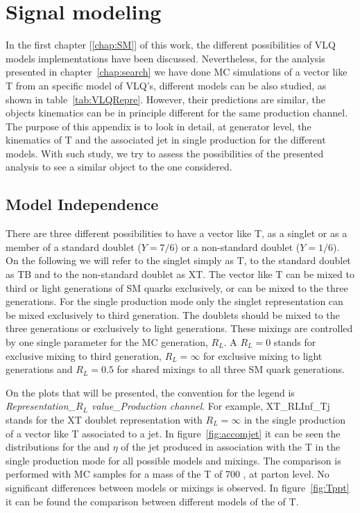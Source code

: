 
\chapter{Signal modeling}
\label{chap:sigmod}

In the first chapter [\ref{chap:SM}] of this work, the different possibilities of VLQ models implementations have been discussed. Nevertheless, for the analysis presented in chapter~\ref{chap:search} we have done MC simulations of a vector like T from an specific model of VLQ's, different models can be also studied, as shown in table~\ref{tab:VLQRepre}. However, their predictions are similar, the objects kinematics can be in principle different for the same production channel. The purpose of this appendix is to look in detail, at generator level, the kinematics of T and the associated jet in single production for the different models. With such study, we try to assess the possibilities of the presented analysis to see a similar object to the one considered.

\section{Model Independence}
\label{sec:modindp}

There are three different possibilities to have a vector like T, as a singlet or as a member of a standard doublet ($Y=7/6$) or a non-standard doublet ($Y=1/6$). On the following we will refer to the singlet simply as T, to the standard doublet as TB and to the non-standard doublet as XT. The vector like T can be mixed to third or light generations of SM quarks exclusively, or can be mixed to the three generations. For the single production mode only the singlet representation can be mixed exclusively to third generation. The doublets should be mixed to the three generations or exclusively to light generations. These mixings are controlled by one single parameter for the MC generation, $R_{L}$. A $R_{L}=0$ stands for exclusive mixing to third generation, $R_{L}=\infty$ for exclusive mixing to light generations and $R_{L}=0.5$ for shared mixings to all three SM quark generations. 

On the plots that will be presented, the convention for the legend is \textit{Representation\_$R_{L}$ value\_Production channel}. For example, XT\_RLInf\_Tj stands for the XT doublet representation with $R_{L}=\infty$ in the single production of a vector like T associated to a jet. In figure~\ref{fig:accomjet} it can be seen the distributions for the \pt and $\eta$ of the jet produced in association with the T in the single production mode for all possible models and mixings. The comparison is performed with MC samples for a mass of the T of 700 \GeVcc, at parton level. No significant differences between models or mixings is observed. In figure~\ref{fig:Tppt} it can be found the comparison between different models of the \pt of T. 


